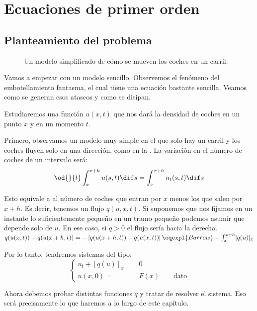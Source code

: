 \chapter{Ecuaciones de primer orden}

	\section{Planteamiento del problema}

	\begin{figure}[thbp]
	\centering
	\caption{Un modelo simplificado de cómo se mueven los coches en un carril.}
	\label{fig:CochesCarril}
	\end{figure}

	Vamos a empezar con un modelo sencillo. Observemos el fenómeno del embotellamiento fantasma, el cual tiene una ecuación bastante sencilla. Veamos como se generan esos atascos y como se disipan.

	Estudiaremos una función $u(x,t)$ que nos dará la densidad de coches en un punto $x$ y en un momento $t$.

	Primero, observamos un modelo muy simple en el que solo hay un carril y los coches fluyen solo en una dirección, como en la . La variación en el número de coches de un intervalo será:
	\[ \od{}{t} \int^{x+h}_{x} u(s,t) \dif s = \int^{x+h}_{x} u_t(s,t) \dif s \]

	Esto equivale a al número de coches que entran por $x$ menos los que salen por $x + h$. Es decir, tenemos un flujo $q(u, x, t)$. Si suponemos que nos fijamos en un instante lo suficientemente pequeño en un tramo pequeño podemos asumir que depende solo de $u$. En ese caso, si $q > 0$ el flujo sería hacia la derecha.
	\( q(u(x,t)) - q(u(x+h,t)) = -\left[ q(u(x+h,t)) -  q(u(x,t)) \right] \eqexpl{Barrow} -\int^{x+h}_{x} [q(u)]_{x}
	\label{eq:BaseFlujo}\)

	Por lo tanto, tendremos sistemas del tipo:
	\begin{equation}
	\left\{
	\begin{array}{rl}
	u_t + [q(u)]_{x} =&\!\!\! 0 \\
	u(x, 0) =&\!\!\! F(x) \quad \quad \text{dato}
	\end{array}
	\right. \label{eq:ModeloAtasco}
	\end{equation}

	Ahora debemos probar distintas funciones $q$ y tratar de resolver el sistema. Eso será precisamente lo que haremos a lo largo de este capítulo.

